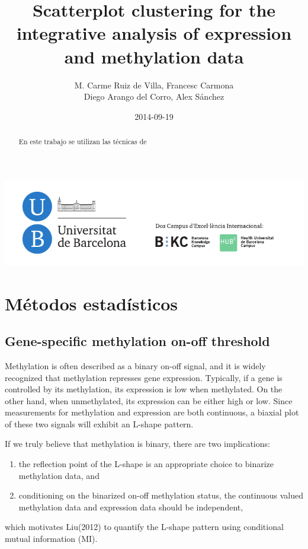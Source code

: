 \documentclass[a4paper,10pt]{article}
\title{Scatterplot clustering for the integrative analysis of expression and methylation data}
\author{M. Carme Ruiz de Villa, Francesc Carmona \\ Diego Arango del Corro, Alex Sánchez}
\date{2014-09-19}
\begin{document}


\maketitle
\thispagestyle{empty}

\begin{abstract}
En este trabajo se utilizan las técnicas de 
\end{abstract}

\vfill

\begin{center}
\includegraphics{figuras/signatura_cmyk.pdf}
\end{center}

\newpage

\section{Métodos estadísticos}

\subsection{Gene-specific methylation on-off threshold}

Methylation is often described as a binary on-off signal,
and it is widely recognized that methylation represses gene
expression. Typically, if a gene is controlled by its methylation,
its expression is low when methylated. 
On the other hand,
when unmethylated, its expression can be either high or low.
Since measurements for methylation and expression are both
continuous, a biaxial plot of these two signals will exhibit an
L-shape pattern. 

\medskip
If we truly believe that methylation is binary, there are two implications:
\begin{enumerate}
\item the reflection point of the L-shape is an appropriate choice
to binarize methylation data, and
\item conditioning on the
binarized on-off methylation status, the continuous valued
methylation data and expression data should be independent,
\end{enumerate}
which motivates Liu(2012) to quantify the L-shape pattern using
conditional mutual information (MI). 
\end{document}
